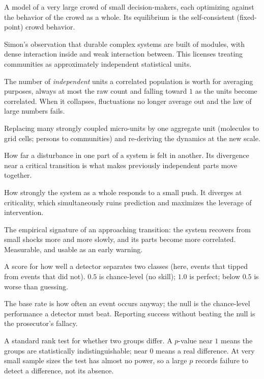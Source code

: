 \documentclass[11pt]{article}
\begin{document}
\begin{description}[itemsep=2pt,leftmargin=1.6em]
\item[Mean-field game (MFG)] A model of a very large crowd of small decision-makers, each optimizing against the behavior of the crowd as a whole. Its equilibrium is the self-consistent (fixed-point) crowd behavior.
\item[Near-decomposability] Simon's observation that durable complex systems are built of modules, with dense interaction inside and weak interaction between. This licenses treating communities as approximately independent statistical units.
\item[Effective $N$ ($N_{\mathrm{eff}}$, Kish form)] The number of \emph{independent} units a correlated population is worth for averaging purposes, always at most the raw count and falling toward $1$ as the units become correlated. When it collapses, fluctuations no longer average out and the law of large numbers fails.
\item[Coarse-graining / renormalization] Replacing many strongly coupled micro-units by one aggregate unit (molecules to grid cells; persons to communities) and re-deriving the dynamics at the new scale.
\item[Correlation length ($\xi$)] How far a disturbance in one part of a system is felt in another. Its divergence near a critical transition is what makes previously independent parts move together.
\item[Susceptibility ($\chi$)] How strongly the system as a whole responds to a small push. It diverges at criticality, which simultaneously ruins prediction and maximizes the leverage of intervention.
\item[Critical slowing-down] The empirical signature of an approaching transition: the system recovers from small shocks more and more slowly, and its parts become more correlated. Measurable, and usable as an early warning.
\item[AUC (area under the ROC curve)] A score for how well a detector separates two classes (here, events that tipped from events that did not). $0.5$ is chance-level (no skill); $1.0$ is perfect; below $0.5$ is worse than guessing.
\item[Base rate / null] The base rate is how often an event occurs anyway; the null is the chance-level performance a detector must beat. Reporting success without beating the null is the prosecutor's fallacy.
\item[Mann-Whitney test] A standard rank test for whether two groups differ. A $p$-value near $1$ means the groups are statistically indistinguishable; near $0$ means a real difference. At very small sample sizes the test has almost no power, so a large $p$ records failure to detect a difference, not its absence.

\end{description}
\end{document}
